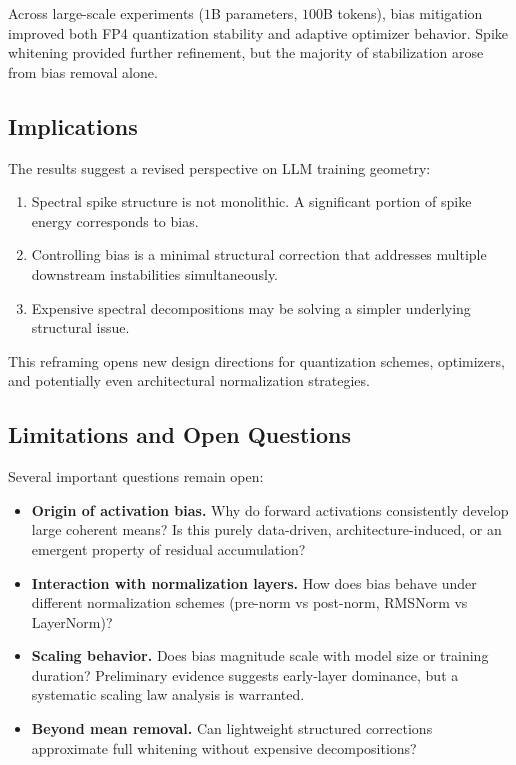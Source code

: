Across large-scale experiments ($1$B parameters, $100$B tokens),
bias mitigation improved both FP4 quantization stability
and adaptive optimizer behavior.
Spike whitening provided further refinement,
but the majority of stabilization arose from bias removal alone.

\subsection{Implications}

The results suggest a revised perspective on LLM training geometry:

\begin{enumerate}
    \item Spectral spike structure is not monolithic.
    A significant portion of spike energy corresponds to bias.
    \item Controlling bias is a minimal structural correction
    that addresses multiple downstream instabilities simultaneously.
    \item Expensive spectral decompositions may be solving
    a simpler underlying structural issue.
\end{enumerate}

This reframing opens new design directions
for quantization schemes, optimizers,
and potentially even architectural normalization strategies.

\subsection{Limitations and Open Questions}

Several important questions remain open:

\begin{itemize}
    \item \textbf{Origin of activation bias.}
    Why do forward activations consistently develop large coherent means?
    Is this purely data-driven, architecture-induced,
    or an emergent property of residual accumulation?
    
    \item \textbf{Interaction with normalization layers.}
    How does bias behave under different normalization schemes
    (pre-norm vs post-norm, RMSNorm vs LayerNorm)?
    
    \item \textbf{Scaling behavior.}
    Does bias magnitude scale with model size or training duration?
    Preliminary evidence suggests early-layer dominance,
    but a systematic scaling law analysis is warranted.
    
    \item \textbf{Beyond mean removal.}
    Can lightweight structured corrections approximate full whitening
    without expensive decompositions?
\end{itemize}

